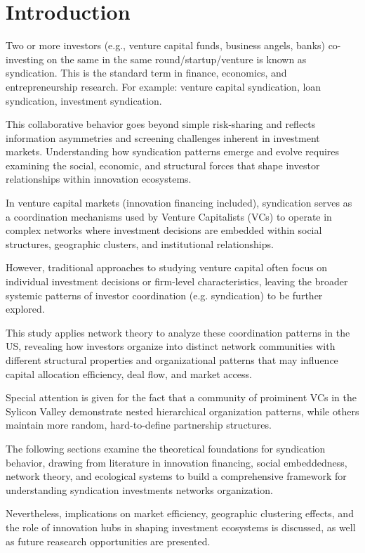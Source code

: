 \section{Introduction}

Two or more investors (e.g., venture capital funds, business angels, banks) co-investing on the same in the same round/startup/venture is known as syndication. This is the standard term in finance, economics, and entrepreneurship research. For example: venture capital syndication, loan syndication, investment syndication.

This collaborative behavior goes beyond simple risk-sharing and reflects information asymmetries and screening challenges inherent in investment markets. Understanding how syndication patterns emerge and evolve requires examining the social, economic, and structural forces that shape investor relationships within innovation ecosystems.

In venture capital markets (innovation financing included), syndication serves as a coordination mechanisms used by Venture Capitalists (VCs) to operate in complex networks where investment decisions are embedded within social structures, geographic clusters, and institutional relationships. 

However, traditional approaches to studying venture capital often focus on individual investment decisions or firm-level characteristics, leaving the broader systemic patterns of investor coordination (e.g. syndication) to be further explored.

This study applies network theory to analyze these coordination patterns in the US, revealing how investors organize into distinct network communities with different structural properties and organizational patterns that may influence capital allocation efficiency, deal flow, and market access.

Special attention is given for the fact that a community of proiminent VCs in the Sylicon Valley  demonstrate nested hierarchical organization patterns, while others maintain more random, hard-to-define partnership structures.

The following sections examine the theoretical foundations for syndication behavior, drawing from literature in innovation financing, social embeddedness, network theory, and ecological systems to build a comprehensive framework for understanding syndication investments networks organization. 

Nevertheless, implications on market efficiency, geographic clustering effects, and the role of innovation hubs in shaping investment ecosystems is discussed, as well as future reasearch opportunities are presented.

